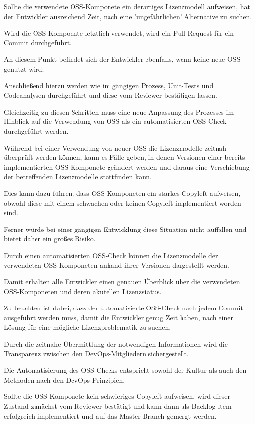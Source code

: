Sollte die verwendete OSS-Komponete ein derartiges Lizenzmodell aufweisen, hat der Entwickler ausreichend Zeit, nach eine 'ungefährlichen' Alternative zu suchen.  

Wird die OSS-Kompoente letztlich verwendet, wird ein Pull-Request für ein Commit durchgeführt. 

An diesem Punkt befindet sich der Entwickler ebenfalls, wenn keine neue OSS genutzt wird. 

Anschließend hierzu werden wie im gängigen Prozess, Unit-Tests und Codeanalysen durchgeführt und diese  vom Reviewer bestätigen lassen.

Gleichzeitig zu diesen Schritten muss eine neue Anpassung des Prozesses im Hinblick auf die Verwendung von OSS als ein automatisierten OSS-Check durchgeführt werden.

Während bei einer Verwendung von neuer OSS die Lizenzmodelle zeitnah überprüft werden können, kann es Fälle geben, in denen Versionen einer bereits implementierten OSS-Komponete geändert werden und daraus eine Verschiebung der betreffenden Lizenzmodelle stattfinden kann. 

Dies kann dazu führen, dass OSS-Komponeten ein starkes Copyleft aufweisen, obwohl diese mit einem schwachen oder keinen Copyleft implementiert worden sind. 

Ferner würde bei einer gängigen Entwicklung diese Situation nicht auffallen und bietet daher ein großes Risiko. 

Durch einen automatisierten OSS-Check können die Lizenzmodelle der verwendeten OSS-Komponeten anhand ihrer Versionen dargestellt werden. 

Damit erhalten alle Entwickler einen genauen Überblick über die verwendeten OSS-Komponeten und deren akutellen Lizenzstatus. 

Zu beachten ist dabei, dass der automatisierte OSS-Check nach jedem Commit ausgeführt werden muss, damit die Entwickler genug Zeit haben, nach einer Lösung für eine mögliche Lizenzproblematik zu suchen.

Durch die zeitnahe Übermittlung der notwendigen Informationen wird die Transparenz zwischen den DevOps-Mitgliedern sichergestellt. 

Die Automatisierung des OSS-Checks entspricht sowohl der Kultur als auch den Methoden nach den DevOps-Prinzipien.

Sollte die OSS-Komponete kein schwieriges Copyleft aufweisen, wird dieser Zustand zunächst vom Reviewer bestätigt und kann dann als Backlog Item erfolgreich implementiert und auf das Master Branch gemergt werden. 


